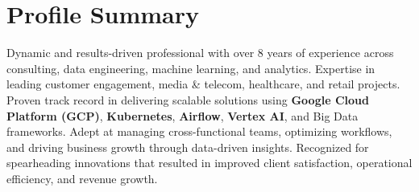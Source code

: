 \section{Profile Summary}
\vspace{-3pt}
\small{
    Dynamic and results-driven professional with over 8 years of experience across consulting, data engineering, machine learning, and analytics. Expertise in leading customer engagement, media \& telecom, healthcare, and retail projects. Proven track record in delivering scalable solutions using \textbf{Google Cloud Platform (GCP)}, \textbf{Kubernetes}, \textbf{Airflow}, \textbf{Vertex AI}, and Big Data frameworks. Adept at managing cross-functional teams, optimizing workflows, and driving business growth through data-driven insights. Recognized for spearheading innovations that resulted in improved client satisfaction, operational efficiency, and revenue growth.
}
\vspace{-2pt}
